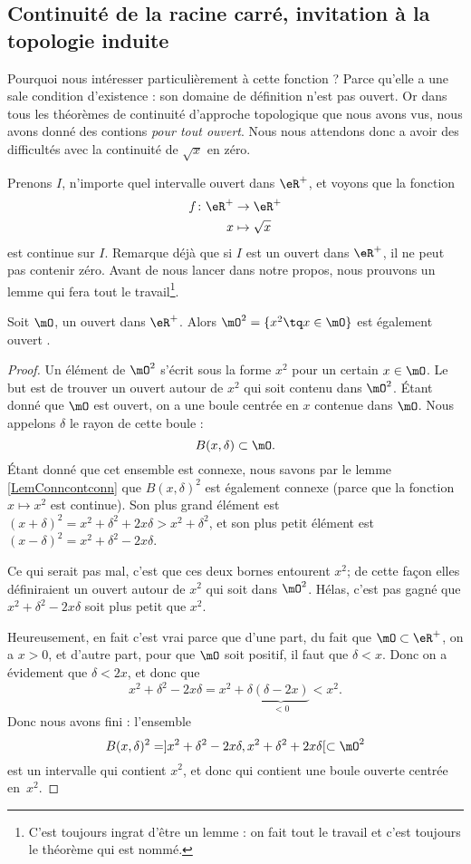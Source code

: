 \subsection{Continuité de la racine carré, invitation à la topologie induite}

Pourquoi nous intéresser particulièrement à cette fonction ? Parce qu'elle a une sale condition d'existence : son domaine de définition n'est pas ouvert. Or dans tous les théorèmes de continuité d'approche topologique que nous avons vus, nous avons donné des contions \emph{pour tout ouvert}. Nous nous attendons donc a avoir des difficultés avec la continuité de $\sqrt{x}$ en zéro.

Prenons $I$, n'importe quel intervalle ouvert dans $\eR^+$, et voyons que la fonction
\begin{equation}
\begin{aligned}
 f\colon \eR^+&\to \eR^+ \\ 
   x&\mapsto \sqrt{x} 
\end{aligned}
\end{equation}
est continue sur $I$. Remarque déjà que si $I$ est un ouvert dans $\eR^+$, il ne peut pas contenir zéro. Avant de nous lancer dans notre propos, nous prouvons un lemme qui fera tout le travail\footnote{C'est toujours ingrat d'être un lemme : on fait tout le travail et c'est toujours le théorème qui est nommé.}.

\begin{lemma}
Soit $\mO$, un ouvert dans $\eR^+$. Alors $\mO^2=\{ x^2\tq x\in\mO \}$ est également ouvert .
\end{lemma}

\begin{proof}
Un élément de $\mO^2$ s'écrit sous la forme $x^2$ pour un certain $x\in\mO$. Le but est de trouver un ouvert autour de $x^2$ qui soit contenu dans $\mO^2$. Étant donné que $\mO$ est ouvert, on a une boule centrée en $x$ contenue dans $\mO$. Nous appelons $\delta$ le rayon de cette boule :
\[ 
  B(x,\delta)\subset\mO.
\]
Étant donné que cet ensemble est connexe, nous savons par le lemme \ref{LemConncontconn} que $B(x,\delta)^2$ est également connexe (parce que la fonction $x\mapsto x^2$ est continue). Son plus grand élément est $(x+\delta)^2=x^2+\delta^2+2x\delta>x^2+\delta^2$, et son plus petit élément est $(x-\delta)^2=x^2+\delta^2-2x\delta$. 

Ce qui serait pas mal, c'est que ces deux bornes entourent $x^2$; de cette façon elles définiraient un ouvert autour de $x^2$ qui soit dans $\mO^2$. Hélas, c'est pas gagné que $x^2+\delta^2-2x\delta$ soit plus petit que $x^2$. 

Heureusement, en fait c'est vrai parce que d'une part, du fait que $\mO\subset\eR^+$, on a $x>0$, et d'autre part, pour que $\mO$ soit positif, il faut que $\delta<x$. Donc on a évidement que $\delta<2x$, et donc que
\[ 
  x^2+\delta^2-2x\delta=x^2+\delta\underbrace{(\delta-2x)}_{<0}<x^2.
\]
Donc nous avons fini : l'ensemble
\[ 
  B(x,\delta)^2=]x^2+\delta^2-2x\delta,x^2+\delta^2+2x\delta[\subset\mO^2
\]
est un intervalle qui contient $x^2$, et donc qui contient une boule ouverte centrée en~$x^2$.

\end{proof}


